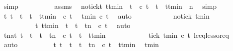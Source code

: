 \begin{isabellebody}
\ simp\isanewline
\ \ \ \ \ \ \ \ \isamarkupfalse%
\ assms\ \isamarkupfalse%
\ notick{\isacharcolon}{\isacartoucheopen}{\isacharparenleft}{\isasymforall}t{\isacharprime}{\isachardot}\ ttmin\ {\isacharless}\ t{\isacharprime}\ {\isasymand}\ c\ t{\isacharprime}\ {\isasymlongrightarrow}\ t{\isacharprime}\ {\isachargreater}\ ttmin\ {\isacharplus}\ n{\isacharparenright}{\isacartoucheclose}\ \isamarkupfalse%
\ simp\isanewline
\ \ \ \ \ \ \ \ \isamarkupfalse%
\ {\isacartoucheopen}{\isasymforall}t{\isacharprime}{\isachardot}\ {\isacharparenleft}t\ {\isacharless}\ t{\isacharprime}\ {\isasymand}\ t{\isacharprime}\ {\isacharless}\ ttmin{\isacharparenright}\ {\isasymlongrightarrow}\ {\isasymnot}c\ t{\isacharprime}{\isacartoucheclose}\ \isamarkupfalse%
\ tmin\ {\isacartoucheopen}{\isasymnot}c\ t{\isacartoucheclose}\ \isamarkupfalse%
\ auto\isanewline
\ \ \ \ \ \ \ \ \isamarkupfalse%
\ \isamarkupfalse%
\ notick\ tmin\ \isamarkupfalse%
\isanewline
\ \ \ \ \ \ \ \ \ \ {\isacartoucheopen}{\isasymforall}t{\isacharprime}{\isachardot}\ {\isacharparenleft}ttmin\ {\isacharless}\ t{\isacharprime}\ {\isasymand}\ t{\isacharprime}\ {\isasymle}\ t{\isacharplus}n{\isacharparenright}\ {\isasymlongrightarrow}\ {\isasymnot}c\ t{\isacharprime}{\isacartoucheclose}\ \isamarkupfalse%
\ auto\isanewline
\ \ \ \ \ \ \ \ \isamarkupfalse%
\ \isamarkupfalse%
\ {\isacartoucheopen}{\isasymforall}t{\isacharprime}{\isacharcolon}{\isacharcolon}nat{\isachardot}\ {\isacharparenleft}t\ {\isasymle}\ t{\isacharprime}\ {\isasymand}\ t{\isacharprime}\ {\isasymle}\ t{\isacharplus}n\ {\isasymand}\ c\ t{\isacharprime}{\isacharparenright}\ {\isasymlongrightarrow}\ t{\isacharprime}\ {\isacharequal}\ ttmin{\isacartoucheclose}\isanewline
\ \ \ \ \ \ \ \ \ \ \isamarkupfalse%
\ tick\ tmin\ {\isacartoucheopen}{\isasymnot}c\ t{\isacartoucheclose}\ le{\isacharunderscore}eq{\isacharunderscore}less{\isacharunderscore}or{\isacharunderscore}eq\ \isamarkupfalse%
\ auto\isanewline
\ \ \ \ \ \ \ \ \isamarkupfalse%
\ {\isacartoucheopen}{\isacharbraceleft}t{\isacharprime}{\isachardot}\ t\ {\isasymle}\ t{\isacharprime}\ {\isasymand}\ t{\isacharprime}\ {\isasymle}\ t{\isacharplus}n\ {\isasymand}\ c\ t{\isacharprime}{\isacharbraceright}\ {\isacharequal}\ {\isacharbraceleft}ttmin{\isacharbraceright}{\isacartoucheclose}\ \isamarkupfalse%
\ tmin\ \isamarkupfalse%

\end{isabellebody}
